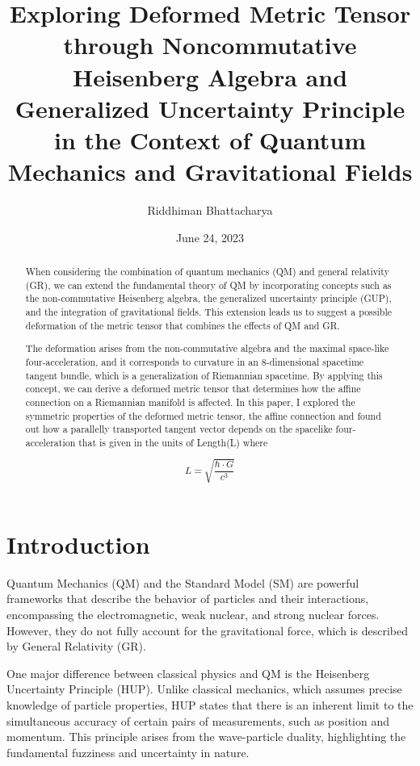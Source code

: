 \documentclass{article}
\title{\textbf{Exploring Deformed Metric Tensor through Noncommutative Heisenberg Algebra and Generalized Uncertainty Principle in the Context of Quantum Mechanics and Gravitational Fields}}
\author{\Large Riddhiman Bhattacharya}
\date{June 24, 2023}
\begin{document}
\maketitle
\large 
\begin{abstract}
\Large


When considering the combination of quantum mechanics (QM) and general relativity (GR), we can extend the fundamental theory of QM by incorporating concepts such as the non-commutative Heisenberg algebra, the generalized uncertainty principle (GUP), and the integration of gravitational fields. This extension leads us to suggest a possible deformation of the metric tensor that combines the effects of QM and GR.

The deformation arises from the non-commutative algebra and the maximal space-like four-acceleration, and it corresponds to curvature in an 8-dimensional spacetime tangent bundle, which is a generalization of Riemannian spacetime. By applying this concept, we can derive a deformed metric tensor that determines how the affine connection on a Riemannian manifold is affected.
In this paper, I explored the symmetric properties of the deformed metric tensor, the affine connection and found out how a parallelly transported tangent vector depends on the spacelike four-acceleration that is given in the units of Length(L)
where 


\begin{equation}
L = \sqrt{\frac{\hbar \cdot G}{c^3}}
\label{eq:1}
\end{equation}

\end{abstract}

\section{\huge Introduction}
\Large 

Quantum Mechanics (QM) and the Standard Model (SM) are powerful frameworks that describe the behavior of particles and their interactions, encompassing the electromagnetic, weak nuclear, and strong nuclear forces. However, they do not fully account for the gravitational force, which is described by General Relativity (GR).

One major difference between classical physics and QM is the Heisenberg Uncertainty Principle (HUP). Unlike classical mechanics, which assumes precise knowledge of particle properties, HUP states that there is an inherent limit to the simultaneous accuracy of certain pairs of measurements, such as position and momentum. This principle arises from the wave-particle duality, highlighting the fundamental fuzziness and uncertainty in nature.
\end{document}
